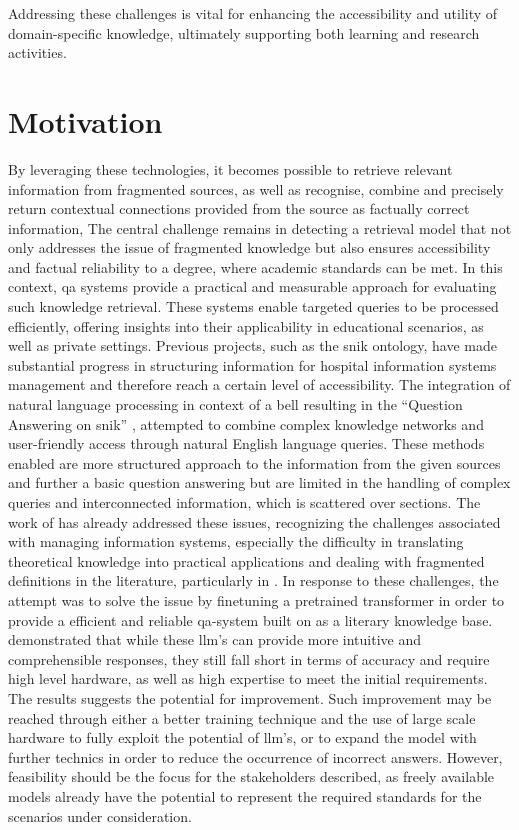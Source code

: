 Addressing these challenges is vital for enhancing the accessibility and utility of domain-specific knowledge, ultimately supporting both learning and research activities. 

\section{Motivation}\label{motivation}
By leveraging these technologies, it becomes possible to retrieve relevant information from fragmented sources, as well as recognise, combine and precisely return contextual connections provided from the source as factually correct information, 
The central challenge remains in detecting a retrieval model that not only addresses the issue of fragmented knowledge but also ensures accessibility and factual reliability to a degree, where academic standards can be met. 
In this context, \ac{qa} systems provide a practical and measurable approach for evaluating such knowledge retrieval. 
These systems enable targeted queries to be processed efficiently, offering insights into their applicability in educational scenarios, as well as private settings.
% 
Previous projects, such as the \ac{snik} ontology, have made substantial progress in structuring information for hospital information systems management and therefore reach a certain level of accessibility. 
The integration of natural language processing in context of a \ac{bell} resulting in the \enquote{Question Answering on \ac{snik}} \citep{hannesbell, hannesbell_skill}, attempted to combine complex knowledge networks and user-friendly access through natural English language queries. 
These methods enabled are more structured approach to the information from the given sources and further a basic question answering but are limited in the handling of complex queries and interconnected information, which is scattered over sections.
The work of \citet{Paul_Keller} has already addressed these issues, recognizing the challenges associated with managing information systems, especially the difficulty in translating theoretical knowledge into practical applications and dealing with fragmented definitions in the literature, particularly in \citet{bb2}. 
In response to these challenges, the attempt was to solve the issue by finetuning a pretrained transformer in order to provide a efficient and reliable \ac{qa}-system built on \citet{bb2} as a literary knowledge base.
\citet{Paul_Keller} demonstrated that while these \ac{llm}'s can provide more intuitive and comprehensible responses, they still fall short in terms of accuracy and require high level hardware, as well as high expertise to meet the initial requirements. 
The results suggests the potential for improvement. 
Such improvement may be reached through either a better training technique and the use of large scale hardware to fully exploit the potential of \ac{llm}'s, or to expand the model with further technics in order to reduce the occurrence of incorrect answers.
%
However, feasibility should be the focus for the stakeholders described, as freely available models already have the potential to represent the required standards for the scenarios under consideration. 
 
